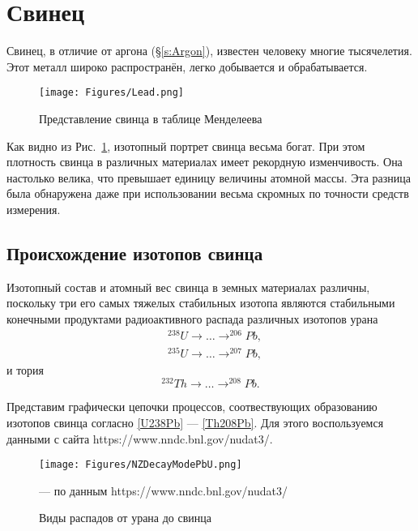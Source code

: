 \documentclass[a5paper,openany]{book}
\begin{document}
\section{Свинец} \label{s:Lead}

Свинец, в отличие от аргона (\S\ref{s:Argon}), известен человеку многие тысячелетия. Этот металл широко распространён, легко добывается и обрабатывается. 

\begin{figure}[ht] 
	\centering\small
	\texttt{[image: Figures/Lead.png]}
	\caption{Представление свинца в таблице Менделеева} 
	\label{f:Lead}
\end{figure}

Как видно из Рис.~\ref{f:Lead}, изотопный портрет свинца весьма богат. При этом плотность свинца в различных материалах имеет рекордную изменчивость. Она настолько велика, что превышает единицу величины атомной массы. Эта разница была обнаружена даже при использовании весьма скромных по точности средств измерения. 

\subsection{Происхождение изотопов свинца} \label{PbIsotopesOrigin}

Изотопный состав и атомный вес свинца в земных материалах различны, поскольку три его самых тяжелых стабильных изотопа являются стабильными конечными продуктами радиоактивного распада различных изотопов урана 
\begin{align}
& ^{238}U \longrightarrow \ldots \longrightarrow  ^{206}Pb,  \label{U238Pb} \\ 
& ^{235}U \longrightarrow \ldots \longrightarrow  ^{207}Pb, \label{U235Pb}
\end{align}
и тория 
\begin{equation} \label{Th208Pb}
^{232}Th \longrightarrow \ldots \longrightarrow ^{208}Pb.
\end{equation}

Представим графически цепочки процессов, соотвествующих образованию изотопов свинца согласно \eqref{U238Pb} --- \eqref{Th208Pb}.
Для этого воспользуемся данными с сайта https://www.nndc.bnl.gov/nudat3/.


\begin{figure}[ht] 
	\centering\small
	\texttt{[image: Figures/NZDecayModePbU.png]}
	\caption{Виды распадов от урана до свинца} 	--- по данным https://www.nndc.bnl.gov/nudat3/
	\label{f:NZDecayModePbU}
\end{figure}
\end{document}
